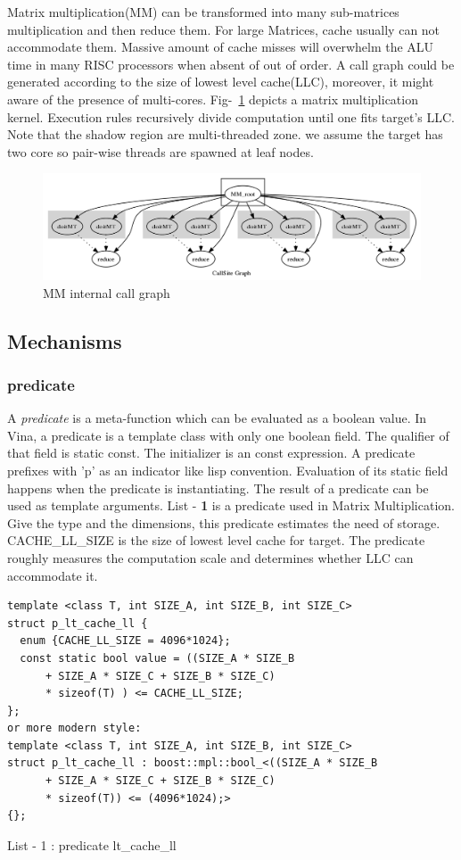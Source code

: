 \documentclass[a4paper, 11pt]{article}
\begin{document}
Matrix multiplication(MM) can be transformed into many sub-matrices multiplication and then reduce them. For large Matrices, cache usually can not accommodate them. Massive amount of cache misses will overwhelm the ALU time in many RISC processors when absent of out of order.  A call graph could be generated according to the size of lowest level cache(LLC), moreover, it might aware of the presence of multi-cores. Fig-~\ref{mm-icg} depicts a matrix multiplication kernel. Execution rules recursively divide computation until one fits target's LLC. Note that the shadow region are multi-threaded zone. we assume the target has two core so pair-wise threads are spawned at leaf nodes. 

\begin{figure}
\centering
\includegraphics[width=\textwidth]{test_matrix}
\caption{MM internal call graph}
\label{mm-icg}
\end{figure}

\subsection{Mechanisms}
\subsubsection{predicate}
A \emph{predicate} is a meta-function which can be evaluated as a boolean value. In Vina, a predicate is a template class with only one boolean field. The qualifier of that field is static const. The initializer is an const expression. A predicate prefixes with 'p' as an indicator like lisp convention. Evaluation of its static field happens when the predicate is instantiating. The result of a predicate can be used as template arguments.
List - \textbf{1} is a predicate used in Matrix Multiplication. Give the type and the dimensions, this predicate estimates the need of storage. CACHE\_LL\_SIZE is the size of lowest level cache for target. The predicate roughly measures the computation scale and determines whether LLC can accommodate it.\\
\makebox[\textwidth]{\hrulefill}
\begin{verbatim}
template <class T, int SIZE_A, int SIZE_B, int SIZE_C>
struct p_lt_cache_ll {
  enum {CACHE_LL_SIZE = 4096*1024};
  const static bool value = ((SIZE_A * SIZE_B 
      + SIZE_A * SIZE_C + SIZE_B * SIZE_C) 
      * sizeof(T) ) <= CACHE_LL_SIZE;
};
or more modern style:
template <class T, int SIZE_A, int SIZE_B, int SIZE_C>
struct p_lt_cache_ll : boost::mpl::bool_<((SIZE_A * SIZE_B 
      + SIZE_A * SIZE_C + SIZE_B * SIZE_C) 
      * sizeof(T)) <= (4096*1024);>
{};
\end{verbatim}
\makebox[\textwidth]{\hrulefill}
\begin{center}
List - 1 : predicate lt\_cache\_ll
\label{code-pred}
\end{center}
\end{document}
